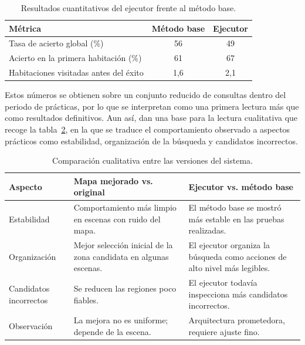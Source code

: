 \documentclass[11pt,fleqn,openany]{book} %
\begin{document}
\begin{table}[H]
\centering
\renewcommand{\arraystretch}{1.3}
\setlength{\tabcolsep}{6pt}
\begin{tabular}{>{\raggedright\arraybackslash}p{6.4cm}cc}
\toprule
\rowcolor{ocre!12}
\textbf{Métrica} & \textbf{Método base} & \textbf{Ejecutor}\\
\midrule
Tasa de acierto global (\%)                & 56 & 49 \\
\midrule
Acierto en la primera habitación (\%)      & 61 & 67 \\
\midrule
Habitaciones visitadas antes del éxito     & 1{,}6 & 2{,}1 \\
\bottomrule
\end{tabular}
\caption[Resultados cuantitativos del ejecutor frente al método base.]{Resultados cuantitativos del ejecutor frente al método base.}
\label{tab:cuant_ejec}
\end{table}

Estos números se obtienen sobre un conjunto reducido de consultas dentro del periodo de prácticas, por lo que se interpretan como una primera lectura más que como resultados definitivos. Aun así, dan una base para la lectura cualitativa que recoge la tabla~\ref{tab:comparacion_metodos}, en la que se traduce el comportamiento observado a aspectos prácticos como estabilidad, organización de la búsqueda y candidatos incorrectos.

\begin{table}[H]
\centering
\renewcommand{\arraystretch}{1.35}
\setlength{\tabcolsep}{8pt}
\begin{tabular}{>{\raggedright\arraybackslash}p{3.0cm}
                 >{\raggedright\arraybackslash}p{4.6cm}
                 >{\raggedright\arraybackslash}p{4.8cm}}
\toprule
\rowcolor{ocre!12}
\textbf{Aspecto} & \textbf{Mapa mejorado vs. original} & \textbf{Ejecutor vs. método base}\\
\midrule
Estabilidad &
Comportamiento más limpio en escenas con ruido del mapa. &
El método base se mostró más estable en las pruebas realizadas. \\
\midrule
Organización &
Mejor selección inicial de la zona candidata en algunas escenas. &
El ejecutor organiza la búsqueda como acciones de alto nivel más legibles. \\
\midrule
Candidatos incorrectos &
Se reducen las regiones poco fiables. &
El ejecutor todavía inspecciona más candidatos incorrectos. \\
\midrule
Observación &
La mejora no es uniforme; depende de la escena. &
Arquitectura prometedora, requiere ajuste fino. \\
\bottomrule
\end{tabular}
\caption[Comparación cualitativa entre las versiones del sistema.]{Comparación cualitativa entre las versiones del sistema.}
\label{tab:comparacion_metodos}
\end{table}
\end{document}

